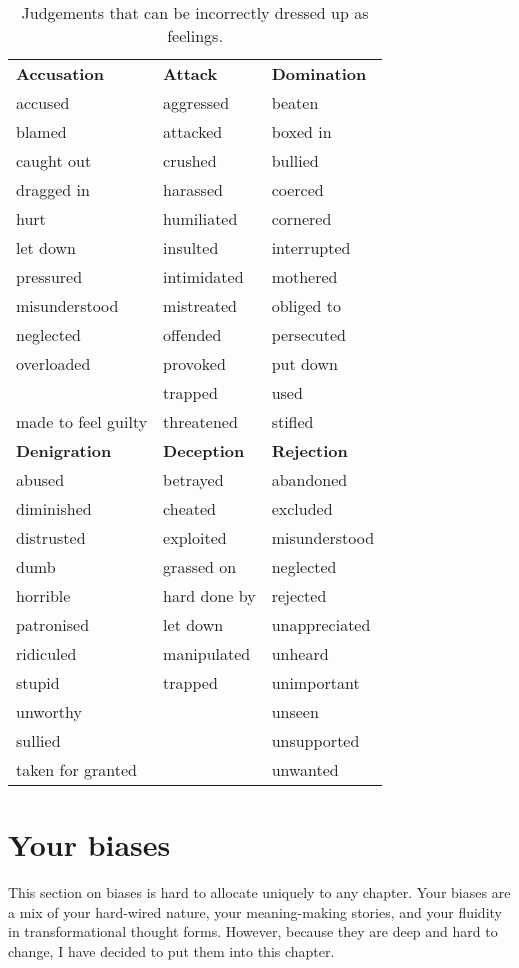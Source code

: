 \begin{longtable}{ p{} p{}  p{}  }
        \caption[Judgements dressed up as feelings]{Judgements that can be incorrectly dressed up as feelings. \label{table:judgements}} \\[-.5em]
        \toprule
        \textbf{Accusation} & \textbf{Attack} & \textbf{Domination} \\
        accused & aggressed & beaten\\
        blamed & attacked & boxed in\\
        caught out & crushed & bullied \\
        dragged in & harassed & coerced \\
        hurt & humiliated & cornered \\
        let down & insulted & interrupted \\
        pressured & intimidated & mothered \\
        misunderstood & mistreated & obliged to \\
        neglected & offended & persecuted \\
        overloaded & provoked & put down \\
        & trapped & used  \\
        made to feel guilty & threatened & stifled \\
        \addlinespace[.5em]
        \textbf{Denigration} & \textbf{Deception} & \textbf{Rejection} \\
        abused & betrayed & abandoned \\
        diminished & cheated & excluded \\
        distrusted & exploited & misunderstood \\
        dumb & grassed on & neglected \\
        horrible & hard done by & rejected \\
        patronised & let down & unappreciated \\
        ridiculed & manipulated & unheard \\
        stupid & trapped & unimportant \\
        unworthy & & unseen \\
        sullied & & unsupported \\
        taken for granted & & unwanted  \\
        \bottomrule
\end{longtable}  
\section{Your biases}
\label{section:biases}
This section on biases is hard to allocate uniquely to any chapter. Your biases are a mix of your hard-wired nature, your meaning\hyp{}making stories, and your fluidity in transformational thought forms.  However, because they are deep and hard to change, I have decided to put them into this chapter.


